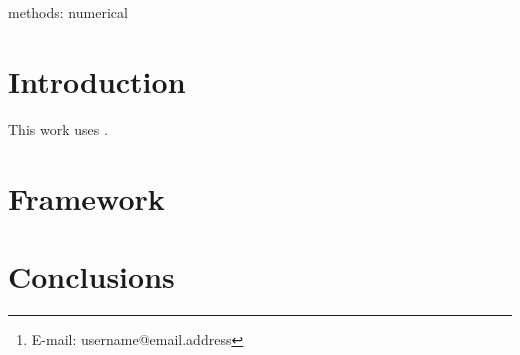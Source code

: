 \documentclass[useAMS,usenatbib]{mn2e}
\date{}
\title[]{}
\author[Author list]%
{First Last \thanks{E-mail: username@email.address}\\%
Institute
}
\begin{document}
\maketitle

\label{firstpage}

\begin{abstract}
\end{abstract}

\begin{keywords}
methods: numerical
\end{keywords}

\section{Introduction}
\label{introduction}

This work uses \cite{2012MNRAS.425.3077L}.

\section{Framework}
\label{framework}

\section{Conclusions}
\label{conclusions}





\bsp

\label{lastpage}
\end{document}
